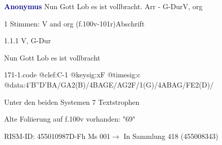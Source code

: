 \documentclass[twocolumn]{book}
\begin{document}
\par \vspace{7pt} \textcolor{darkblue}{\textbf{Anonymus  }}\hfillplus{\textbf{[171]}}\newline Nun Gott Lob es ist vollbracht. Arr - G-Dur\newline V, org
\par \begin{itshape}\end{itshape} 
\par \textcolor{darkblue}{}  1 Stimmen: V and org  (f.100v-101r)\newline Abschrift
\par 1.1.1  V, G-Dur\newline \begin{footnotesize} Nun Gott Lob es ist vollbracht \end{footnotesize}  
\begin{filecontents*}{171-1.code}
@clef:C-1
@keysig:xF
@timesig:c
@data:4'B''D'BA/GA2(B)/4BAGE/AG2F/1(G)/4ABAG/FE2(D)/
\end{filecontents*}
\newline
%
\par Unter den beiden Systemen 7 Textstrophen
\par Alte Foliierung auf f.100v vorhanden: "69"
\par RISM-ID: 455010987\newline D-Fh  Ms 001\newline $\rightarrow$ In Sammlung 418 (455008343)
      
\end{document}
